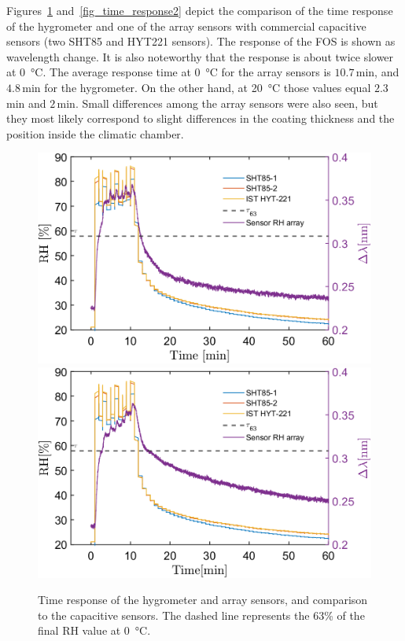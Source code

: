 Figures~\ref{fig_time_response} and~\ref{fig_time_response2} depict the comparison of the time response of the hygrometer and one of the array sensors with commercial capacitive sensors (two SHT85 and HYT221 sensors). The response of the \gls{FOS} is shown as wavelength change. It is also noteworthy that the response is about twice slower at \SI{0}{\celsius}. The average response time at \SI{0}{\celsius} for the array sensors is $10.7$\,min, and $4.8$\,min for the hygrometer. On the other hand, at \SI{20}{\celsius} those values equal $2.3$\,min and $2$\,min. Small differences among the array sensors were also seen, but they most likely correspond to slight differences in the coating thickness and the position inside the climatic chamber. 
\begin{figure}[!h]
\centering
\includegraphics[width=0.47\columnwidth]{Chapter5/images/20responseRH.png}
\includegraphics[width=0.47\columnwidth]{Chapter5/images/20responseRH2.png}
\caption{Time response of the hygrometer and array sensors, and comparison to the capacitive sensors. The dashed line represents the 63\% of the final \gls{RH} value at \SI{0}{\celsius}.}
\label{fig_time_response}
\end{figure}

